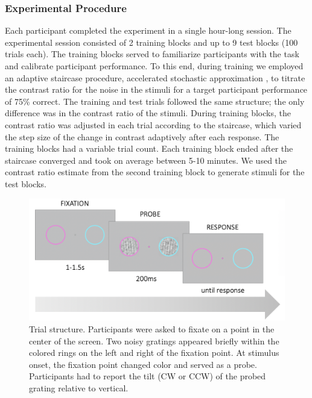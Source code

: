 \documentclass[a4paper, nobind]{templates/ociamthesis}
\begin{document}
\hypertarget{experimental-procedure}{%
\subsubsection{Experimental Procedure}\label{experimental-procedure}}

Each participant completed the experiment in a single hour-long session. The experimental session consisted of 2 training blocks and up to 9 test blocks (100 trials each). The training blocks served to familiarize participants with the task and calibrate participant performance. To this end, during training we employed an adaptive staircase procedure, accelerated stochastic approximation \autocite{lu2013}, to titrate the contrast ratio for the noise in the stimuli for a target participant performance of 75\% correct. The training and test trials followed the same structure; the only difference was in the contrast ratio of the stimuli. During training blocks, the contrast ratio was adjusted in each trial according to the staircase, which varied the step size of the change in contrast adaptively after each response. The training blocks had a variable trial count. Each training block ended after the staircase converged and took on average between 5-10 minutes. We used the contrast ratio estimate from the second training block to generate stimuli for the test blocks.

\begin{figure}

{\centering \includegraphics[width=1\linewidth]{figures/distr-trial-a} 

}

\caption[Experiment 1, Trial structure]{Trial structure. Participants were asked to fixate on a point in the center of the screen. Two noisy gratings appeared briefly within the colored rings on the left and right of the fixation point. At stimulus onset, the fixation point changed color and served as a probe. Participants had to report the tilt (CW or CCW) of the probed grating relative to vertical.}\label{fig:distr-trial-a}
\end{figure}
\end{document}
